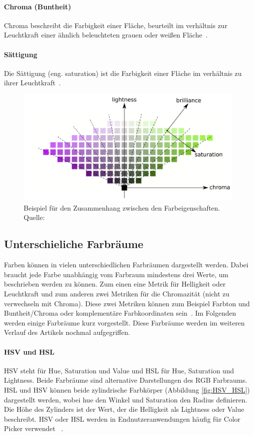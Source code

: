 \documentclass[12pt, a4paper, ngerman]{article}
\begin{document}
\paragraph{Chroma (Buntheit)}
Chroma beschreibt die Farbigkeit einer Fläche, beurteilt im verhältnis zur Leuchtkraft 
einer ähnlich beleuchteten grauen oder weißen Fläche~\cite{Darktable_2023}. 

\paragraph{Sättigung}
Die Sättigung (eng. saturation) ist die Farbigkeit einer Fläche im verhältnis zu ihrer Leuchtkraft~\cite{Darktable_2023}.

\begin{figure}
  \centering
  \includegraphics[width=\textwidth]{Grafiken/KoordinatenFarbeigenschaften.png}
  \caption{Beispiel für den Zusammenhang zwischen den Farbeigenschaften. Quelle: \cite{Darktable_2023}}
  \label{fig:ExColordimension}
\end{figure}

\subsection{Unterschieliche Farbräume}
Farben können in vielen unterschiedlichen Farbräumen dargestellt werden. 
Dabei braucht jede Farbe unabhängig vom Farbraum mindestens drei Werte, um beschrieben werden zu können.
Zum einen eine Metrik für Helligkeit oder Leuchtkraft und zum anderen zwei Metriken für die Chromazität 
(nicht zu verwechseln mit Chroma). 
Diese zwei Metriken können zum Beispiel Farbton und Buntheit/Chroma oder komplementäre Farbkoordinaten sein~\cite{Darktable_2023}.
Im Folgenden werden einige Farbräume kurz vorgestellt. Diese Farbräume werden im weiteren Verlauf des Artikels nochmal aufgegriffen.

\paragraph{HSV und HSL}
HSV steht für Hue, Saturation und Value und HSL für Hue, Saturation und Lightness.
Beide Farbräume sind alternative Darstellungen des RGB Farbraums. 
HSL und HSV können beide zylindrische Farbkörper (Abbildung \ref{fig:HSV_HSL}) dargestellt werden, 
wobei hue den Winkel und Saturation den Radius definieren.
Die Höhe des Zylinders ist der Wert, der die Helligkeit als Lightness oder Value beschreibt.
HSV oder HSL werden in Endnutzeranwendungen häufig für Color Picker verwendet ~\cite{HSL_and_HSV_2023}.
\end{document}

